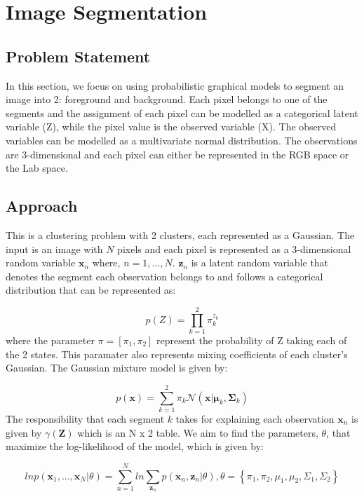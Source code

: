 \documentclass{article}
\begin{document}
    \section{Image Segmentation}

    \subsection{Problem Statement}
    In this section, we focus on using probabilistic graphical models to segment an image into 2: foreground and background.
    Each pixel belongs to one of the segments and the assignment of each pixel can be modelled as a categorical latent variable (Z),
    while the pixel value is the observed variable (X). The observed variables can be modelled as a multivariate normal distribution.
    The observations are 3-dimensional and each pixel can either be represented in the RGB space or the Lab space.

    \subsection{Approach}
    This is a clustering problem with 2 clusters, each represented as a Gaussian. The input is an image with $N$ pixels and
    each pixel is represented as a 3-dimensional random variable $\bm{x}_n$ where, $n=1,...,N$. $\bm{z}_n$ is a latent
    random variable that denotes the segment each observation belongs to and follows a categorical distribution that can be represented as:

    \begin{equation}
        p(Z) = \prod_{k=1}^{2} \pi_k^{z_k}
    \end{equation}
    \noindent
    where the parameter $\pi = [\pi_1, \pi_2]$ represent the probability of Z taking each of the 2 states. This paramater also represents
    mixing coefficients of each cluster's Gaussian. The Gaussian mixture model is given by:

    \begin{equation}
        p(\bm{x}) = \sum_{k=1}^{2} \pi_k \mathcal{N} \left(\bm{x}|\bm{\mu}_k,\bm{\Sigma}_k\right)
    \end{equation}
    \noindent
    The responsibility that each segment $k$ takes for explaining each observation $\bm{x}_n$ is given by $\gamma(\bm{Z})$
    which is an N x 2 table. We aim to find the parameters, $\theta$, that maximize the log-likelihood of the model, which is given by:

    \begin{equation}
        ln p(\bm{x}_1,...,\bm{x}_N|\theta) = \sum_{n=1}^{N}ln\sum_{\bm{z}_n}p(\bm{x}_n, \bm{z}_n|\theta), \theta = \left\{\pi_1,\pi_2,\mu_1,\mu_2,\Sigma_1,\Sigma_2 \right\}
    \end{equation}
\end{document}
